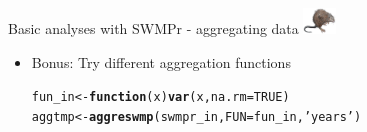 \documentclass[xcolor=dvipsnames]{beamer}\usepackage[]{graphicx}\usepackage[]{color}
\makeatletter
\newcommand{\hlnum}[1]{\textcolor[rgb]{0.686,0.059,0.569}{#1}}%
\newcommand{\hlstr}[1]{\textcolor[rgb]{0.192,0.494,0.8}{#1}}%
\newcommand{\hlstd}[1]{\textcolor[rgb]{0.345,0.345,0.345}{#1}}%
\newcommand{\hlkwa}[1]{\textcolor[rgb]{0.161,0.373,0.58}{\textbf{#1}}}%
\newcommand{\hlkwb}[1]{\textcolor[rgb]{0.69,0.353,0.396}{#1}}%
\newcommand{\hlkwc}[1]{\textcolor[rgb]{0.333,0.667,0.333}{#1}}%
\newcommand{\hlkwd}[1]{\textcolor[rgb]{0.737,0.353,0.396}{\textbf{#1}}}%
\newenvironment{kframe}{%
 \def\at@end@of@kframe{}%
 \ifinner\ifhmode%
  \def\at@end@of@kframe{\end{minipage}}%
  \begin{minipage}{\columnwidth}%
 \fi\fi%
 \def\FrameCommand##1{\hskip\@totalleftmargin \hskip-\fboxsep
 \colorbox{shadecolor}{##1}\hskip-\fboxsep
     \hskip-\linewidth \hskip-\@totalleftmargin \hskip\columnwidth}%
 \MakeFramed {\advance\hsize-\width
   \@totalleftmargin\z@ \linewidth\hsize
   \@setminipage}}%
 {\par\unskip\endMakeFramed%
 \at@end@of@kframe}
\newenvironment{knitrout}{}{} %
\makeatother
\begin{document}
\begin{frame}[fragile,t]{Basic analyses with SWMPr - aggregating data \includegraphics[width = 0.065\textwidth]{imgs/swmprat.png}}
\begin{itemize}
\begin{knitrout}
\begin{kframe}
\end{kframe}
\end{knitrout}
\vspace{0.1in}
\item
{}
Bonus: Try different aggregation functions
\begin{knitrout}\scriptsize
{}\color{fgcolor}\begin{kframe}
\begin{alltt}
\hlstd{fun_in} \hlkwb{<-} \hlkwa{function}\hlstd{(}\hlkwc{x}\hlstd{)}  \hlkwd{var}\hlstd{(x,} \hlkwc{na.rm} \hlstd{=} \hlnum{TRUE}\hlstd{)}
\hlstd{aggtmp} \hlkwb{<-} \hlkwd{aggreswmp}\hlstd{(swmpr_in,} \hlkwc{FUN} \hlstd{= fun_in,} \hlstr{'years'}\hlstd{)}
\end{alltt}
\end{kframe}
\end{knitrout}
\vspace{0.1in}
\end{itemize}
\end{frame}
\end{document}
